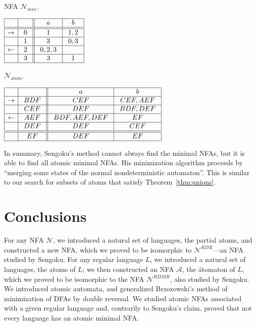 \documentclass[preprint,12pt]{elsarticle}
\newcommand{\cA}{{\mathcal A}}
\newcommand{\cN}{{\mathcal N}}
\begin{document}
\begin{table}[t]
\begin{minipage}[b]{0.3\linewidth}
\caption{NFA $\cN_{min}$.}
\label{tab:n_mp}
{\footnotesize
\begin{center}
$
\begin{array}{|c|c|| c|c|}    
\hline
 & & \  a \
& \ b \  \\
\hline
\hline
\rightarrow & 0 
& \ 1 \ & 1,2  \\
\hline  
 & 1 
 & 3 & \  0,3 \ \\
\hline  
\leftarrow & \ 2 \ 
& \ 0,2,3 \ &  \\
\hline  
 & \ 3 \ 
& \ 3 \ & 1 \\
\hline  
\end{array}
$
\end{center}}
\end{minipage}
\hspace{0.5cm}
\begin{minipage}[b]{0.45\linewidth}
\caption{$\cN_{atom}$.}
\label{tab:n5_mp}
{\footnotesize
\begin{center}
$
\begin{array}{|c| c||c| c| }    
\hline
& \ \  \ \ 
&\ \ a \ \ &\ \ b \ \   \\
\hline  
\rightarrow & BDF
& CEF &CEF,AEF  \\
\hline  
 & \ CEF \
& DEF  & \ BDF,DEF \  \\
\hline  
\leftarrow & AEF
&  \ BDF, AEF, DEF \ & EF  \\
\hline  
 & \ DEF \
& DEF  & \ CEF \  \\
\hline  \hline
 & \ EF \
&\ DEF  \ & EF \\
\hline  
\end{array}
$
\end{center}}
\end{minipage}
\vskip-0.3cm
\end{table}

\vskip-0.1cm
In summary, Sengoku's method cannot always find the minimal NFAs, but 
 it is able to find all atomic minimal NFAs.
His minimization algorithm proceeds by 
``merging some states of the normal nondeterministic automaton''.
This is similar to our search for subsets of atoms that satisfy 
Theorem~\ref{thm:unions}.

\section{Conclusions}
\label{sec:conc}
For any NFA $\cN$, we introduced a natural set of languages, the partial atoms, and constructed a new NFA, which we proved to be isomorphic to $\cN^{RDR}$---an NFA studied by Sengoku.
For any regular language $L$, we introduced a natural set of languages, the atoms of $L$; we then constructed an NFA $\cA$, the \'atomaton of $L$, which we proved to be isomorphic to the NFA $\cN^{RDMR}$, also studied by Sengoku.
 We  introduced atomic automata, and generalized 
Brzozowski's method of minimization of DFAs by double reversal.
We studied atomic NFAs associated with a given regular language and,
contrarily to Sengoku's claim, proved that not every language has an atomic 
minimal NFA.
\end{document}
